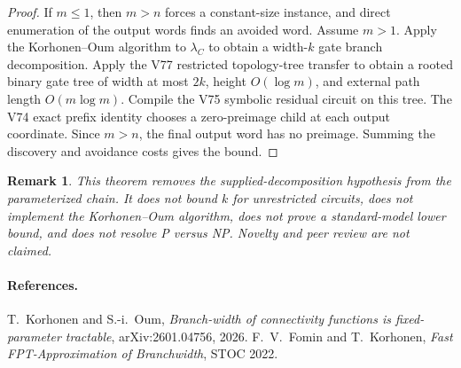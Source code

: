 \documentclass[11pt]{article}
\newtheorem{remark}{Remark}
\begin{document}
\begin{proof}
If $m\leq1$, then $m>n$ forces a constant-size instance, and direct enumeration
of the output words finds an avoided word. Assume $m>1$. Apply the
Korhonen--Oum algorithm to $\lambda_C$ to obtain a width-$k$ gate branch
decomposition. Apply the V77 restricted topology-tree transfer to obtain a
rooted binary gate tree of width at most $2k$, height $O(\log m)$, and external
path length $O(m\log m)$. Compile the V75 symbolic residual circuit on this
tree. The V74 exact prefix identity chooses a zero-preimage child at each
output coordinate. Since $m>n$, the final output word has no preimage. Summing
the discovery and avoidance costs gives the bound.
\end{proof}

\begin{remark}
This theorem removes the supplied-decomposition hypothesis from the
parameterized chain. It does not bound $k$ for unrestricted circuits, does not
implement the Korhonen--Oum algorithm, does not prove a standard-model lower
bound, and does not resolve P versus NP. Novelty and peer review are not
claimed.
\end{remark}

\paragraph{References.}
T.~Korhonen and S.-i.~Oum, \emph{Branch-width of connectivity functions is
fixed-parameter tractable}, arXiv:2601.04756, 2026. F.~V.~Fomin and
T.~Korhonen, \emph{Fast FPT-Approximation of Branchwidth}, STOC 2022.
\end{document}
